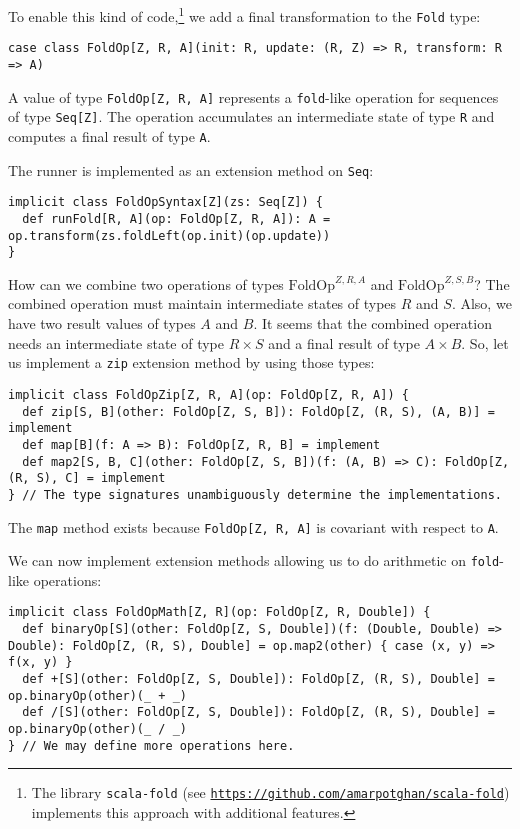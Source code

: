 To enable this kind of code,\footnote{The library \texttt{scala-fold} (see \texttt{\href{https://github.com/amarpotghan/scala-fold}{https://github.com/amarpotghan/scala-fold}})
implements this approach with additional features.} we add a final transformation to the \lstinline!Fold! type:
\begin{lstlisting}
case class FoldOp[Z, R, A](init: R, update: (R, Z) => R, transform: R => A)
\end{lstlisting}
A value of type \lstinline!FoldOp[Z, R, A]! represents a \lstinline!fold!-like
operation for sequences of type \lstinline!Seq[Z]!. The operation
accumulates an intermediate state of type \lstinline!R! and computes
a final result of type \lstinline!A!.

The runner is implemented as an extension method on \lstinline!Seq!:
\begin{lstlisting}
implicit class FoldOpSyntax[Z](zs: Seq[Z]) {
  def runFold[R, A](op: FoldOp[Z, R, A]): A = op.transform(zs.foldLeft(op.init)(op.update))
}
\end{lstlisting}

How can we combine two  operations of types $\text{FoldOp}^{Z,R,A}$
and $\text{FoldOp}^{Z,S,B}$? The combined operation must maintain
intermediate states of types $R$ and $S$. Also, we have two result
values of types $A$ and $B$. It seems that the combined operation
needs an intermediate state of type $R\times S$ and a final result
of type $A\times B$. So, let us implement a \lstinline!zip! extension
method by using those types:
\begin{lstlisting}
implicit class FoldOpZip[Z, R, A](op: FoldOp[Z, R, A]) {
  def zip[S, B](other: FoldOp[Z, S, B]): FoldOp[Z, (R, S), (A, B)] = implement
  def map[B](f: A => B): FoldOp[Z, R, B] = implement
  def map2[S, B, C](other: FoldOp[Z, S, B])(f: (A, B) => C): FoldOp[Z, (R, S), C] = implement
} // The type signatures unambiguously determine the implementations.
\end{lstlisting}
The \lstinline!map! method exists because \lstinline!FoldOp[Z, R, A]!
is covariant with respect to \lstinline!A!.

We can now implement extension methods allowing us to do arithmetic
on \lstinline!fold!-like operations:
\begin{lstlisting}
implicit class FoldOpMath[Z, R](op: FoldOp[Z, R, Double]) {
  def binaryOp[S](other: FoldOp[Z, S, Double])(f: (Double, Double) => Double): FoldOp[Z, (R, S), Double] = op.map2(other) { case (x, y) => f(x, y) }
  def +[S](other: FoldOp[Z, S, Double]): FoldOp[Z, (R, S), Double] = op.binaryOp(other)(_ + _) 
  def /[S](other: FoldOp[Z, S, Double]): FoldOp[Z, (R, S), Double] = op.binaryOp(other)(_ / _) 
} // We may define more operations here.
\end{lstlisting}

